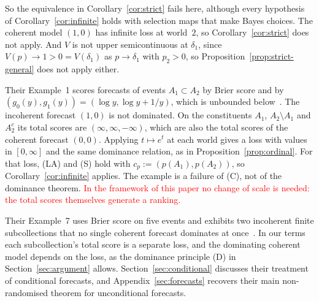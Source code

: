 \documentclass[11pt]{article}
\theoremstyle{definition}
\theoremstyle{remark}
\begin{document}
So the equivalence in Corollary~\ref{cor:strict} fails here, although every hypothesis of Corollary~\ref{cor:infinite} holds with selection maps that make Bayes choices. The coherent model $(1,0)$ has infinite loss at world~$2$, so Corollary~\ref{cor:strict} does not apply. And $V$ is not upper semicontinuous at $\delta_1$, since $V(p)\to1>0=V(\delta_1)$ as $p\to\delta_1$ with $p_2>0$, so Proposition~\ref{prop:strict-general} does not apply either.

Their Example~1 scores forecasts of events $A_1\subset A_2$ by Brier score and by $(g_0(y),g_1(y))=(\log y,\log y+1/y)$, which is unbounded below~\cite[Example~1]{SSK09}. The incoherent forecast $(1,0)$ is not dominated. On the constituents $A_1$, $A_2\setminus A_1$ and $A_2^c$ its total scores are $(\infty,\infty,-\infty)$, which are also the total scores of the coherent forecast $(0,0)$. Applying $t\mapsto e^t$ at each world gives a loss with values in $[0,\infty]$ and the same dominance relation, as in Proposition~\ref{prop:ordinal}. For that loss, (LA) and (S) hold with $c_p:=(p(A_1),p(A_2))$, so Corollary~\ref{cor:infinite} applies. The example is a failure of (C), not of the dominance theorem. \textcolor{red}{In the framework of this paper no change of scale is needed: the total scores themselves generate a ranking.}

Their Example~7 uses Brier score on five events and exhibits two incoherent finite subcollections that no single coherent forecast dominates at once~\cite[Example~7]{SSK09}. In our terms each subcollection's total score is a separate loss, and the dominating coherent model depends on the loss, as the dominance principle (D) in Section~\ref{sec:argument} allows. Section~\ref{sec:conditional} discusses their treatment of conditional forecasts, and Appendix~\ref{sec:forecasts} recovers their main non-randomised theorem for unconditional forecasts.
\end{document}
